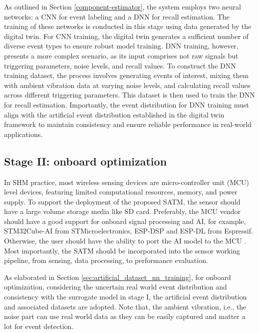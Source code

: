 \documentclass[a4paper,fleqn,numbers,sort&compress]{cas-sc}
\begin{document}
As outlined in Section \ref{component-estimator}, the system employs two neural networks: a CNN for event labeling and a DNN for recall estimation. The training of these networks is conducted in this stage using data generated by the digital twin. For CNN training, the digital twin generates a sufficient number of diverse event types to ensure robust model training. DNN training, however, presents a more complex scenario, as its input comprises not raw signals but triggering parameters, noise levels, and recall values. To construct the DNN training dataset, the process involves generating events of interest, mixing them with ambient vibration data at varying noise levels, and calculating recall values across different triggering parameters. This dataset is then used to train the DNN for recall estimation. Importantly, the event distribution for DNN training must align with the artificial event distribution established in the digital twin framework to maintain consistency and ensure reliable performance in real-world applications. 

\subsection{Stage II: onboard optimization}

In SHM practice, most wireless sensing devices are micro-controller unit (MCU) level devices, featuring limited computational resources, memory, and power supply. To support the deployment of the proposed SATM, the sensor should have a large volume storage media like SD card. Preferably, the MCU vendor should have a good support for onboard signal processing and AI, for example, STM32Cube-AI from STMicroelectronics, ESP-DSP \citep{espressif_espdsp_2025} and ESP-DL \citep{espressif_espdl_2025} from Espressif. Otherwise, the user should have the ability to port the AI model to the MCU \citep{lee_dualcorebased_2024, lin_mcunettinydeep_2020}. Most importantly, the SATM should be incorporated into the sensor working pipeline, from sensing, data processing, to performance evaluation.

As elaborated in Section \ref{sec:artificial_dataset_nn_training}, for onboard optimization, considering the uncertain real world event distribution and consistency with the surrogate model in stage I, the artificial event distribution and associated datasets are adopted. Note that, the ambient vibration, i.e., the noise part can use real world data as they can be easily captured and matter a lot for event detection.
\end{document}
